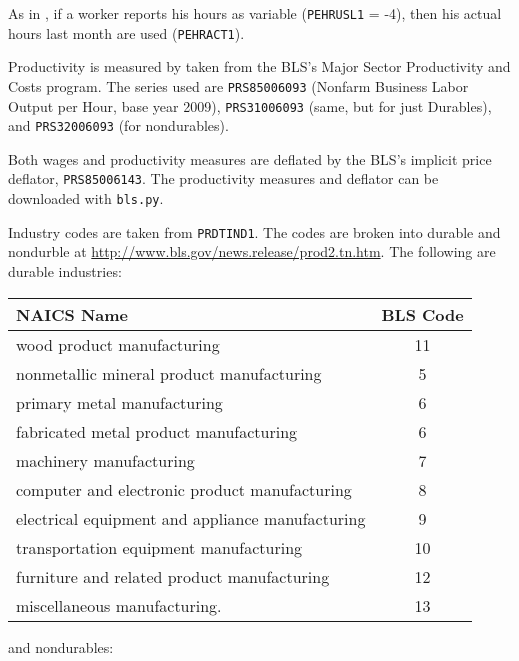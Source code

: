 \documentclass[11pt]{article}
\begin{document}
As in \cite{haefke_sonntag_vanRens_2013}, if a worker reports his hours as variable (\texttt{PEHRUSL1} = -4), then his actual hours last month are used (\texttt{PEHRACT1}).

Productivity is measured by taken from the BLS's Major Sector Productivity and Costs program.
The series used are \texttt{PRS85006093} (Nonfarm Business Labor Output per Hour, base year 2009),
\texttt{PRS31006093} (same, but for just Durables), and \texttt{PRS32006093} (for nondurables).

Both wages and productivity measures are deflated by the BLS's implicit price deflator, \texttt{PRS85006143}.
The productivity measures and deflator can be downloaded with \texttt{bls.py}.

Industry codes are taken from \texttt{PRDTIND1}.
The codes are broken into durable and nondurble at \href{http://www.bls.gov/news.release/prod2.tn.htm}{http://www.bls.gov/news.release/prod2.tn.htm}.
The following are durable industries:

\begin{center}
\begin{tabular}{lc} \toprule
NAICS Name                                      & BLS Code \\ \midrule
wood product manufacturing                      & 11       \\
nonmetallic mineral product manufacturing       & 5        \\
primary metal manufacturing                     & 6        \\
fabricated metal product manufacturing          & 6        \\
machinery manufacturing                         & 7        \\
computer and electronic product manufacturing   & 8        \\
electrical equipment and appliance manufacturing& 9        \\
transportation equipment manufacturing          & 10       \\
furniture and related product manufacturing     & 12       \\
miscellaneous manufacturing.                    & 13       \\
\end{tabular}
\end{center}
and nondurables:
\end{document}
